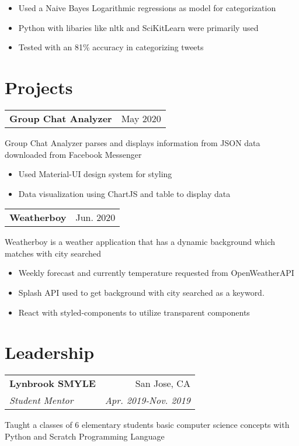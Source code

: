 \documentclass[letterpaper,8pt]{article}
\makeatletter
\newcommand{\resumeSubheading}[4]{
  \vspace{0.25em}
  \begin{tabular*}{0.97\textwidth}[t]{l@{\extracolsep{\fill}}r}
    \textbf{#1} & #2 \\
    \textit{#3} & \textit{#4} \\
  \end{tabular*}\vspace{0.25em}
}
\newcommand{\resumeSubheadingTwo}[2]{
  \vspace{0.25em}
  \begin{tabular*}{0.97\textwidth}[t]{l@{\extracolsep{\fill}}r}
    \textbf{#1} & #2 \\
  \end{tabular*}\vspace{0.25em}
}
\makeatother
\begin{document}
\begin{itemize}[label=\raisebox{0.25ex}{\tiny$\bullet$}]
  \item Used a Naive Bayes Logarithmic regressions as model for categorization
  \item Python with libaries like nltk and SciKitLearn were primarily used
  \item Tested with an 81\% accuracy in categorizing tweets
\end{itemize}

\section{Projects}

\resumeSubheadingTwo{Group Chat Analyzer}{May 2020}

Group Chat Analyzer parses and displays information from JSON data downloaded from Facebook Messenger

\begin{itemize}[label=\raisebox{0.25ex}{\tiny$\bullet$}]
  \item Used Material-UI design system for styling
  \item Data visualization using ChartJS and table to display data
\end{itemize}

\resumeSubheadingTwo{Weatherboy}
{Jun. 2020}

Weatherboy is a weather application that has a dynamic background which matches with city searched

\begin{itemize}[label=\raisebox{0.25ex}{\tiny$\bullet$}]
  \item Weekly forecast and currently temperature requested from OpenWeatherAPI
  \item Splash API used to get background with city searched as a keyword.
  \item React with styled-components to utilize transparent components
\end{itemize}


\section{Leadership}

\resumeSubheading{Lynbrook SMYLE}
{San Jose, CA}{Student Mentor}{Apr. 2019-Nov. 2019}

Taught a classes of 6 elementary students basic computer science concepts with Python and Scratch Programming Language
\end{document}
